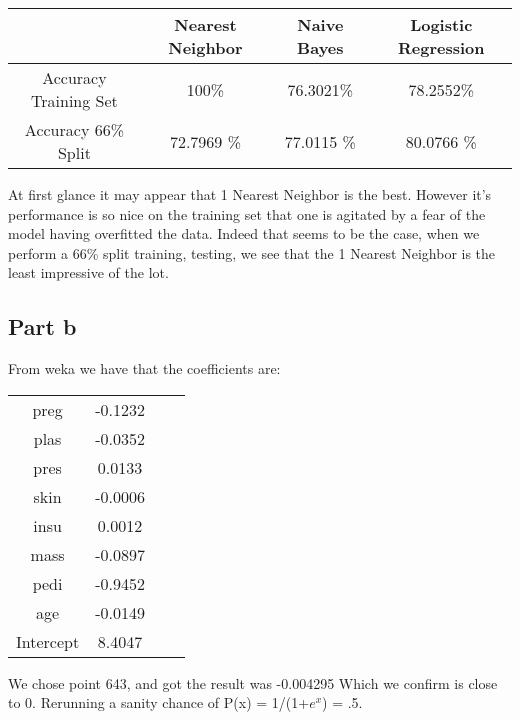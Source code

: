 \documentclass{article}
\begin{document}
\begin{table}[h]
    \begin{center}
    \begin{tabular}{|c|c|c|c|}
   \hline
        & Nearest Neighbor & Naive Bayes & Logistic Regression \\ \hline
         Accuracy Training Set &  100\%&76.3021\% & 78.2552\%   \\ \hline
         Accuracy 66\% Split &  72.7969 \% &77.0115 \% & 80.0766 \% \\\hline
             
     
    \end{tabular}
    \end{center}
\end{table}

At first glance it may appear that 1 Nearest Neighbor is the best. However it's performance is so nice on the training set that one is agitated by a fear of the model having overfitted the data. Indeed that seems to be the case, when we perform a 66\% split training, testing, we see that the 1 Nearest Neighbor is the least impressive of the lot. 

\subsection{Part b}
From weka we have that the coefficients are: 

\begin{table}[h]
    \begin{center}
    \begin{tabular}{|c|c|c|c|}
   \hline
preg          &       -0.1232\\
plas             &    -0.0352\\
pres               &   0.0133\\
skin              &   -0.0006\\
insu               &   0.0012\\
mass              &   -0.0897\\
pedi             &    -0.9452\\
age            &      -0.0149\\
Intercept      &       8.4047\\ %
    \end{tabular}
    \end{center}
\end{table}

We chose point 643, and got the result was -0.004295 Which we confirm is close to 0. Rerunning a sanity chance of P(x) = 1/(1+$e^x$) = .5. 
\end{document}
